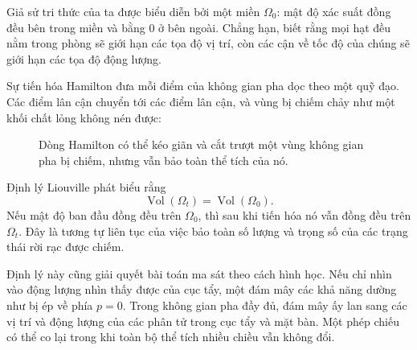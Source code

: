 Giả sử tri thức của ta được biểu diễn bởi một miền \(\Omega_0\): mật độ xác suất đồng đều bên trong miền và bằng 0 ở bên ngoài. Chẳng hạn, biết rằng mọi hạt đều nằm trong phòng sẽ giới hạn các tọa độ vị trí, còn các cận về tốc độ của chúng sẽ giới hạn các tọa độ động lượng.

Sự tiến hóa Hamilton đưa mỗi điểm của không gian pha dọc theo một quỹ đạo. Các điểm lân cận chuyển tới các điểm lân cận, và vùng bị chiếm chảy như một khối chất lỏng không nén được:
\begin{figure}[htbp]
\centering
{}
\caption{Dòng Hamilton có thể kéo giãn và cắt trượt một vùng không gian pha bị chiếm, nhưng vẫn bảo toàn thể tích của nó.}
\label{fig:sm1-liouville-flow}
\end{figure}

Định lý Liouville phát biểu rằng
\begin{equation}
 \operatorname{Vol}(\Omega_t)
 =
 \operatorname{Vol}(\Omega_0).
 \label{eq:sm1-liouville-volume}
\end{equation}
Nếu mật độ ban đầu đồng đều trên \(\Omega_0\), thì sau khi tiến hóa nó vẫn đồng đều trên \(\Omega_t\). Đây là tương tự liên tục của việc bảo toàn số lượng và trọng số của các trạng thái rời rạc được chiếm.

Định lý này cũng giải quyết bài toán ma sát theo cách hình học. Nếu chỉ nhìn vào động lượng nhìn thấy được của cục tẩy, một đám mây các khả năng dường như bị ép về phía \(p=0\). Trong không gian pha đầy đủ, đám mây ấy lan sang các vị trí và động lượng của các phân tử trong cục tẩy và mặt bàn. Một phép chiếu có thể co lại trong khi toàn bộ thể tích nhiều chiều vẫn không đổi.

\begin{classroomqa}
\end{classroomqa}

